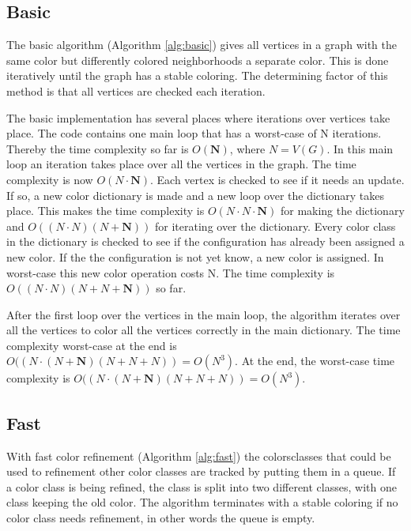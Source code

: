 \documentclass[twoside]{article}
\begin{document}
\begin{multicols}{2}
\subsection{Basic}
The basic algorithm (Algorithm \autoref{alg:basic}) gives all vertices in a graph with the same color but differently colored neighborhoods a separate color. This is done iteratively until the graph has a stable coloring. The determining factor of this method is that all vertices are checked each iteration. 

The basic implementation has several places where iterations over vertices take place. The code contains one main loop that has a worst-case of N iterations. Thereby the time complexity so far is $O(\boldsymbol{N})$, where $N = V(G)$. In this main loop an iteration takes place over all the vertices in the graph. The time complexity is now $O(N \cdot \boldsymbol{N})$. Each vertex is checked to see if it needs an update. If so, a new color dictionary is made and a new loop over the dictionary takes place. This makes the time complexity is $O(N \cdot N \cdot \boldsymbol{N})$ for making the dictionary and $O((N \cdot N)(N+\boldsymbol{N}))$ for iterating over the dictionary. Every color class in the dictionary is checked to see if the configuration has already been assigned a new color. If the the configuration is not yet know, a new color is assigned. In worst-case this new color operation costs N. The time complexity is $O((N \cdot N)(N+N+\boldsymbol{N}))$ so far.

After the first loop over the vertices in the main loop, the algorithm iterates over all the vertices to color all the vertices correctly in the main dictionary. The time complexity worst-case at the end is $O((N \cdot (N+\boldsymbol{N})(N+N+N)) = O(N^3)$. At the end, the worst-case time complexity is $O((N \cdot (N+\boldsymbol{N})(N+N+N)) = O(N^3)$.


\subsection{Fast}
With fast color refinement (Algorithm \autoref{alg:fast}) the colorsclasses that could be used to refinement other color classes are tracked by putting them in a queue. If a color class is being refined, the class is split into two different classes, with one class keeping the old color. The algorithm terminates with a stable coloring if no color class needs refinement, in other words the queue is empty. 


\end{multicols}
\end{document}
